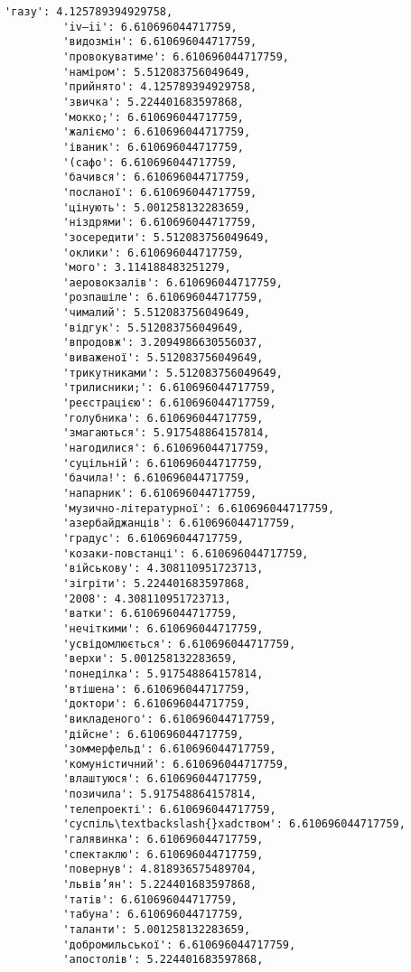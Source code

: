 \documentclass[11pt]{article}
\begin{document}
\begin{Verbatim}[commandchars=\\\{\}]
         'газу': 4.125789394929758,
         'iv—ii': 6.610696044717759,
         'видозмін': 6.610696044717759,
         'провокуватиме': 6.610696044717759,
         'наміром': 5.512083756049649,
         'прийнято': 4.125789394929758,
         'звичка': 5.224401683597868,
         'мокко;': 6.610696044717759,
         'жаліємо': 6.610696044717759,
         'іваник': 6.610696044717759,
         '(сафо': 6.610696044717759,
         'бачився': 6.610696044717759,
         'посланої': 6.610696044717759,
         'цінують': 5.001258132283659,
         'ніздрями': 6.610696044717759,
         'зосередити': 5.512083756049649,
         'оклики': 6.610696044717759,
         'мого': 3.114188483251279,
         'аеровокзалів': 6.610696044717759,
         'розпашіле': 6.610696044717759,
         'чималий': 5.512083756049649,
         'відгук': 5.512083756049649,
         'впродовж': 3.2094986630556037,
         'виваженої': 5.512083756049649,
         'трикутниками': 5.512083756049649,
         'трилисники;': 6.610696044717759,
         'реєстрацією': 6.610696044717759,
         'голубника': 6.610696044717759,
         'змагаються': 5.917548864157814,
         'нагодилися': 6.610696044717759,
         'суцільній': 6.610696044717759,
         'бачила!': 6.610696044717759,
         'напарник': 6.610696044717759,
         'музично-літературної': 6.610696044717759,
         'азербайджанців': 6.610696044717759,
         'градус': 6.610696044717759,
         'козаки-повстанці': 6.610696044717759,
         'військову': 4.308110951723713,
         'зігріти': 5.224401683597868,
         '2008': 4.308110951723713,
         'ватки': 6.610696044717759,
         'нечіткими': 6.610696044717759,
         'усвідомлюється': 6.610696044717759,
         'верхи': 5.001258132283659,
         'понеділка': 5.917548864157814,
         'втішена': 6.610696044717759,
         'доктори': 6.610696044717759,
         'викладеного': 6.610696044717759,
         'дійсне': 6.610696044717759,
         'зоммерфельд': 6.610696044717759,
         'комуністичний': 6.610696044717759,
         'влаштуюся': 6.610696044717759,
         'позичила': 5.917548864157814,
         'телепроекті': 6.610696044717759,
         'суспіль\textbackslash{}xadством': 6.610696044717759,
         'галявинка': 6.610696044717759,
         'спектаклю': 6.610696044717759,
         'повернув': 4.818936575489704,
         'львів’ян': 5.224401683597868,
         'татів': 6.610696044717759,
         'табуна': 6.610696044717759,
         'таланти': 5.001258132283659,
         'добромильської': 6.610696044717759,
         'апостолів': 5.224401683597868,

\end{Verbatim}
\end{document}
